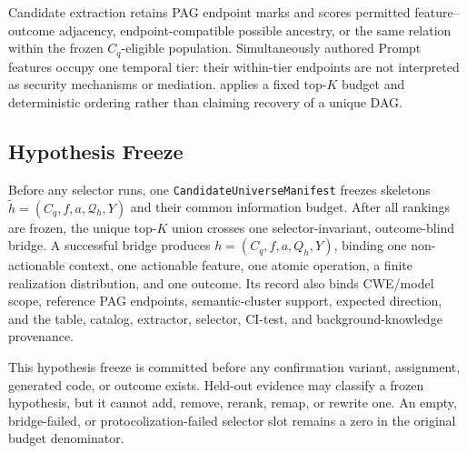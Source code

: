 Candidate extraction retains PAG endpoint marks and scores permitted
feature--outcome adjacency, endpoint-compatible possible ancestry, or the same
relation within the frozen $C_q$-eligible population. Simultaneously authored
Prompt features occupy one temporal tier: their within-tier endpoints are not
interpreted as security mechanisms or mediation. \model applies a fixed
top-$K$ budget and deterministic ordering rather than claiming recovery of a
unique DAG.

\subsection{Hypothesis Freeze}

Before any selector runs, one \texttt{CandidateUniverseManifest} freezes
skeletons $\widetilde h=(C_q,f,a,\mathcal Q_h,Y)$ and their common information
budget. After all rankings are frozen, the unique top-$K$ union crosses one
selector-invariant, outcome-blind bridge. A successful bridge produces
$h=(C_q,f,a,Q_h,Y)$, binding one non-actionable context, one actionable
feature, one atomic operation, a finite realization distribution, and one
outcome. Its record also binds CWE/model scope, reference PAG endpoints,
semantic-cluster support, expected direction, and the table, catalog,
extractor, selector, CI-test, and background-knowledge provenance.

This hypothesis freeze is committed before any confirmation variant,
assignment, generated code, or outcome exists. Held-out evidence may classify
a frozen hypothesis, but it cannot add, remove, rerank, remap, or rewrite one.
An empty, bridge-failed, or protocolization-failed selector slot remains a zero
in the original budget denominator.
